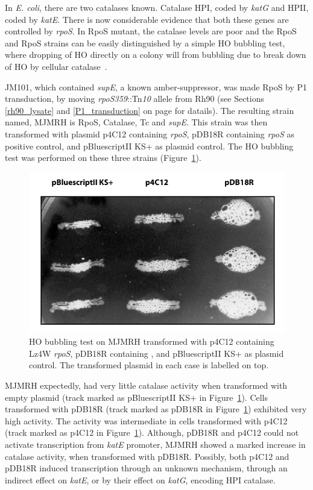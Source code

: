 In \emph{E. coli}, there are two catalases known. Catalase HPI,
coded by \emph{katG} and HPII, coded by \emph{katE}. There is now
considerable evidence that both these genes are controlled by
\emph{rpoS}\@. In RpoS\su{$-$} mutant, the catalase levels are
poor and the RpoS\su{$+$} and RpoS\su{$-$} strains can be easily
distinguished by a simple HO bubbling test, where
dropping of HO directly on a colony will from
bubbling due to break down of HO by cellular
catalase~\citep{Mulvey1988}.

JM101, which contained \emph{supE}, a known amber-suppressor, was
made RpoS\su{$-$} by P1 transduction, by moving
\emph{rpoS359}::Tn\emph{10} allele from Rh90 (see Sections
\ref{rh90_lysate} and \ref{P1_transduction} on page
\pageref{P1_transduction} for datails). The resulting strain
named, MJMRH is RpoS\su{$-$}, Catalase\su{$-$}, Tc and
\emph{supE}\@. This strain was then transformed with plasmid p4C12
containing \emph{rpoS}, pDB18R containing
\emph{rpoS} as positive control, and pBluescriptII KS+ as
plasmid control. The HO bubbling test was performed
on these three strains (Figure~\ref{chap5:jm101}).

\begin{figure}[tbp]
\centering
\includegraphics{figures/chap5_jm101}
\caption[HO bubbling test on complemented
MJMRH]{HO bubbling test on MJMRH transformed
with p4C12 containing Lz4W \emph{rpoS}, pDB18R containing
 , and pBluescriptII KS+ as plasmid control. The
transformed plasmid in each case is labelled on top.}
\label{chap5:jm101}
\end{figure}

MJMRH expectedly, had very little catalase activity when
transformed with empty plasmid (track marked as pBluescriptII KS+
in Figure~\ref{chap5:jm101}). Cells transformed with pDB\-18R
(track marked as pDB18R in Figure~\ref{chap5:jm101}) exhibited
very high activity. The activity was intermediate in cells
transformed with p4C12 (track marked as p4C12 in
Figure~\ref{chap5:jm101}). Although, pDB18R and p4C12 could not
activate transcription from \emph{katE} promoter, MJMRH showed a
marked increase in catalase activity, when transformed with
pDB18R. Possibly, both p4C12 and pDB18R induced transcription
through an unknown mechanism, through an indirect effect on
\emph{katE}, or by their effect on \emph{katG}, encoding HPI
catalase.

